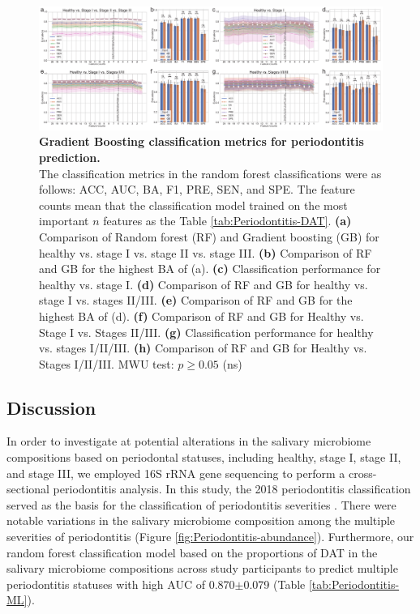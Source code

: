 \documentclass[11pt, a4paper, onecolumn, oneside]{report}
\begin{document}
            \begin{figure}[p]
                \centering
                \includegraphics[width=\linewidth]{Figures/Periodontitis/Figure_R09.pdf}
                \caption[Gradient Boosting classification metrics for periodontitis prediction]{\textbf{Gradient Boosting classification metrics for periodontitis prediction.} \\
                    The classification metrics in the random forest classifications were as follows: ACC, AUC, BA, F1, PRE, SEN, and SPE. The feature counts mean that the classification model trained on the most important $n$ features as the Table \ref{tab:Periodontitis-DAT}. \textbf{(a)} Comparison of Random forest (RF) and Gradient boosting (GB) for healthy vs. stage I vs. stage II vs. stage III. \textbf{(b)} Comparison of RF and GB for the highest BA of (a). \textbf{(c)} Classification performance for healthy vs. stage I. \textbf{(d)} Comparison of RF and GB for healthy vs. stage I vs. stages II/III. \textbf{(e)} Comparison of RF and GB for the highest BA of (d). \textbf{(f)} Comparison of RF and GB for Healthy vs. Stage I vs. Stages II/III. \textbf{(g)} Classification performance for healthy vs. stages I/II/III. \textbf{(h)} Comparison of RF and GB for Healthy vs. Stages I/II/III. MWU test: $p \ge 0.05$ (ns)}
                \label{fig:Periodontitis-GB}
            \end{figure}
            \clearpage
        \newpage

        \subsection{Discussion}
            In order to investigate at potential alterations in the salivary microbiome compositions based on periodontal statuses, including healthy, stage I, stage II, and stage III, we employed 16S rRNA gene sequencing to perform a cross-sectional periodontitis analysis. In this study, the 2018 periodontitis classification served as the basis for the classification of periodontitis severities \cite{Periodontitis-4}. There were notable variations in the salivary microbiome composition among the multiple severities of periodontitis (Figure \ref{fig:Periodontitis-abundance}). Furthermore, our random forest classification model based on the proportions of DAT in the salivary microbiome compositions across study participants to predict multiple periodontitis statuses with high AUC of 0.870$\pm$0.079 (Table \ref{tab:Periodontitis-ML}).
\end{document}
